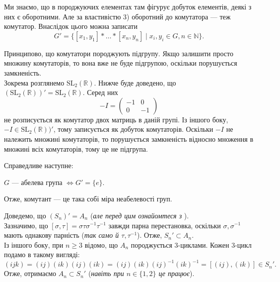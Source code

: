 \documentclass{math_library}
\begin{document}
\begin{remark}
Ми знаємо, що в породжуючих елементах там фігурує добуток елементів, деякі з них є оборотними. Але за властивістю 3) оборотний до комутатора --- теж комутатор. Внаслідок цього можна записати 
\[
G' = \{ [x_1,y_1]*\dots*[x_n,y_n] \mid x_i,y_i \in G, n \in \mathbb{N} \}.
\]
\end{remark}

\begin{remark}
Принципово, що комутатори породжують підгрупу. Якщо залишити просто множину комутаторів, то вона вже не буде підгрупою, оскільки порушується замкненість.
\bigskip \\
Зокрема розглянемо $\mathrm{SL}_2(\mathbb{R})$. Нижче буде доведено, що $(\mathrm{SL}_2(\mathbb{R}))' = \mathrm{SL}_2(\mathbb{R})$. Серед них
\[ 
-I = \begin{pmatrix}
-1 & 0 \\
0 & -1
\end{pmatrix}
\]
не розписується як комутатор двох матриць в даній групі. Із іншого боку, $-I \in \mathrm{SL}_2(\mathbb{R}))'$, тому записується як добуток комутаторів. Оскільки $-I$ не належить множині комутаторів, то порушується замкненість відносно множення в множині всіх комутаторів, тому це не підгрупа.
\end{remark}

\begin{remark}
Справедливе наступне:
\begin{center}
$G$ --- абелева група $\iff G' = \{e\}$.
\end{center}
Отже, комутант --- це така собі міра неабелевості груп.
\end{remark}

\begin{example}
Доведемо, що $(S_n)' = A_n$ (\textit{але перед цим ознайомтеся з }).
\bigskip \\
Зазначимо, що $[\sigma,\tau] = \sigma \tau \sigma^{-1} \tau^{-1}$ завжди парна перестановка, оскільки $\sigma, \sigma^{-1}$ мають однакову парність (\textit{так само й $\tau, \tau^{-1}$}). Отже, $S_n' \subset A_n$.\\
Із іншого боку, при $n \geq 3$ відомо, що $A_n$ породжується $3$-циклами. Кожен $3$-цикл подамо в такому вигляді:
\[
(ijk) = (ij)(ik)(ij)(ik) = (ij)(ik)(ij)^{-1}(ik)^{-1} = [(ij),(ik)] \in S_n'.
\]
Отже, отримаємо $A_n \subset S_n'$ (\textit{навіть при $n \in \{1,2\}$ це працює}).
\end{example}
\end{document}
